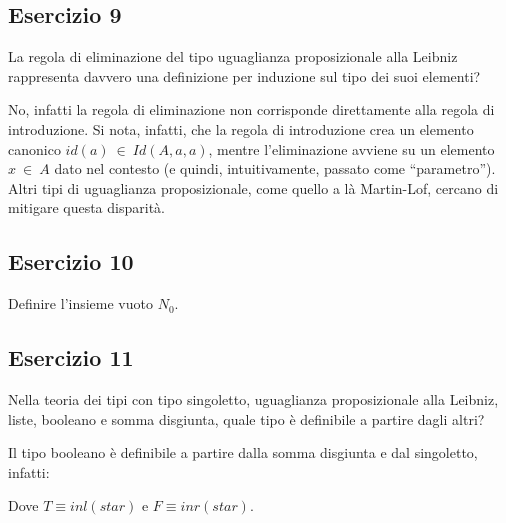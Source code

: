 \subsection{Esercizio 9}
\begin{thm}
	La regola di eliminazione del tipo uguaglianza proposizionale alla Leibniz rappresenta davvero una definizione per induzione sul tipo dei suoi elementi?
\end{thm}
No, infatti la regola di eliminazione non corrisponde direttamente alla regola di introduzione. Si nota, infatti, che la regola di introduzione crea un elemento canonico $id(a)~\in~Id(A,a,a)$, mentre l'eliminazione avviene su un elemento $x~\in~A$ dato nel contesto (e quindi, intuitivamente, passato come ``parametro''). Altri tipi di uguaglianza proposizionale, come quello a là Martin-Lof, cercano di mitigare questa disparità.

\subsection{Esercizio 10}
\begin{thm}
	Definire l'insieme vuoto $N_0$.
\end{thm}


\subsection{Esercizio 11}
\begin{thm}
	Nella teoria dei tipi con tipo singoletto, uguaglianza proposizionale alla Leibniz, liste, booleano e somma disgiunta, quale tipo è definibile a partire dagli altri?
\end{thm}
Il tipo booleano è definibile a partire dalla somma disgiunta e dal singoletto, infatti:

Dove $T \equiv inl (star)$ e $F \equiv inr (star)$.
